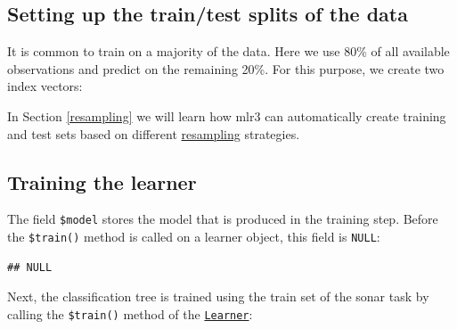 \documentclass[
]{scrbook}
\newenvironment{Shaded}{\begin{snugshade}}{\end{snugshade}}
\newcommand{\AttributeTok}[1]{\textcolor[rgb]{0.77,0.63,0.00}{#1}}
\newcommand{\FloatTok}[1]{\textcolor[rgb]{0.00,0.00,0.81}{#1}}
\newcommand{\FunctionTok}[1]{\textcolor[rgb]{0.00,0.00,0.00}{#1}}
\newcommand{\NormalTok}[1]{#1}
\newcommand{\OtherTok}[1]{\textcolor[rgb]{0.56,0.35,0.01}{#1}}
\newcommand{\SpecialCharTok}[1]{\textcolor[rgb]{0.00,0.00,0.00}{#1}}
\renewenvironment{Shaded} {\begin{snugshade}\small} {\end{snugshade}}
\begin{document}
\hypertarget{split-data}{%
\subsection{Setting up the train/test splits of the data}\label{split-data}}

It is common to train on a majority of the data.
Here we use 80\% of all available observations and predict on the remaining 20\%.
For this purpose, we create two index vectors:

\begin{Shaded}
\end{Shaded}

In Section \ref{resampling} we will learn how mlr3 can automatically create training and test sets based on different \protect\hyperlink{resampling}{resampling} strategies.

\hypertarget{training}{%
\subsection{Training the learner}\label{training}}

The field \texttt{\$model} stores the model that is produced in the training step.
Before the \texttt{\$train()} method is called on a learner object, this field is \texttt{NULL}:

\begin{Shaded}
\end{Shaded}

\begin{verbatim}
## NULL
\end{verbatim}

Next, the classification tree is trained using the train set of the sonar task by calling the \texttt{\$train()} method of the \href{https://mlr3.mlr-org.com/reference/Learner.html}{\texttt{Learner}}:

\begin{Shaded}
\end{Shaded}
\end{document}
